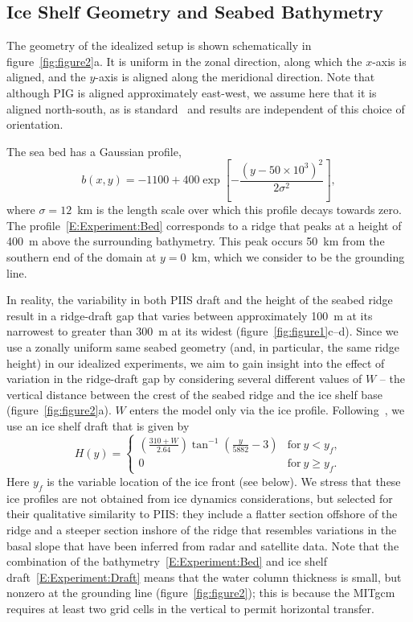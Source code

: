 \documentclass[draft]{agujournal2019}
\begin{document}
\subsection{Ice Shelf Geometry and Seabed Bathymetry}\label{S:Experiment:Geometry}
The geometry of the idealized setup is shown schematically in figure~\ref{fig:figure2}a. It is uniform in the zonal direction, along which the $x$-axis is aligned, and the $y$-axis is aligned along the meridional direction. Note that although PIG is aligned approximately east-west, we assume here that it is aligned north-south, as is standard~\cite{Grosfeld1997JGROceans, DeRydt2014JGeophysResOceans} and results are independent of this choice of orientation.

The sea bed has a Gaussian profile,
\begin{equation}\label{E:Experiment:Bed}
    b(x,y) = -1100 + 400 \exp\left[-\frac{\left(y - 50\times 10^3\right)^2}{2\sigma^2}\right],
\end{equation}
where $\sigma = 12$~km is the length scale over which this profile decays towards zero. The profile~\eqref{E:Experiment:Bed} corresponds to a ridge that peaks at a height of 400~m above the surrounding bathymetry. This peak occurs 50 km from the southern end of the domain at $y=0$~km, which we consider to be the grounding line.

In reality, the variability in both PIIS draft and the height of the seabed ridge result in a ridge-draft gap that varies between approximately 100 m at its narrowest to greater than 300 m at its widest (figure~\ref{fig:figure1}c--d). Since we use a zonally uniform same seabed geometry (and, in particular, the same ridge height) in our idealized experiments, we aim to gain insight into the effect of variation in the ridge-draft gap by considering several different values of $W$ -- the vertical distance between the crest of the seabed ridge and the ice shelf base (figure~\ref{fig:figure2}a). $W$ enters the model only via the ice profile. Following~, we use an ice shelf draft that is given by
\begin{equation}\label{E:Experiment:Draft}
    H(y) = \begin{cases}
    \left(\frac{310 + W}{2.64}\right)\tan^{-1}\left(\frac{y}{5882} -3\right) & \text{for}~y < y_f,\\
    0  & \text{for}~y \geq y_f.
    \end{cases}
\end{equation}
Here $y_f$ is the variable location of the ice front (see below). We stress that these ice profiles are not obtained from ice dynamics considerations, but selected for their qualitative similarity to PIIS: they include a flatter section offshore of the ridge and a steeper section inshore of the ridge that resembles variations in the basal slope that have been inferred from radar and satellite data. Note that the combination of the bathymetry~\eqref{E:Experiment:Bed} and ice shelf draft~\eqref{E:Experiment:Draft} means that the water column thickness is small, but nonzero at the grounding line (figure~\ref{fig:figure2}); this is because the MITgcm requires at least two grid cells in the vertical to permit horizontal transfer.
\end{document}
